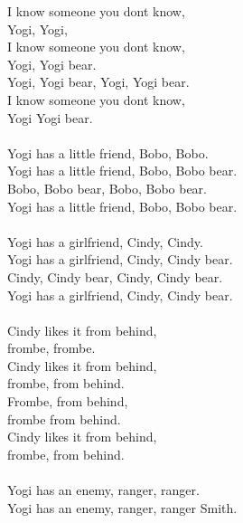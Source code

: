 
            I know someone you dont know,  \\
            Yogi, Yogi, \\
            I know someone you dont know,  \\
            Yogi, Yogi bear. \\
            Yogi, Yogi bear, Yogi, Yogi bear. \\
            I know someone you dont know,  \\
            Yogi Yogi bear. \\
\hspace{10mm} \\
            Yogi has a little friend, Bobo, Bobo.  \\
            Yogi has a little friend, Bobo, Bobo bear.  \\
            Bobo, Bobo bear, Bobo, Bobo bear.  \\
            Yogi has a little friend, Bobo, Bobo bear. \\
\hspace{10mm} \\
            Yogi has a girlfriend, Cindy, Cindy.  \\
            Yogi has a girlfriend, Cindy, Cindy bear.  \\
            Cindy, Cindy bear, Cindy, Cindy bear.  \\
            Yogi has a girlfriend, Cindy, Cindy bear. \\
\hspace{10mm} \\
            Cindy likes it from behind, \\
            frombe, frombe.  \\
            Cindy likes it from behind,  \\
            frombe, from behind. \\
            Frombe, from behind, \\
            frombe from behind. \\
            Cindy likes it from behind, \\
            frombe, from behind. \\
\hspace{10mm} \\
            Yogi has an enemy, ranger, ranger. \\
            Yogi has an enemy, ranger, ranger Smith.  \\
